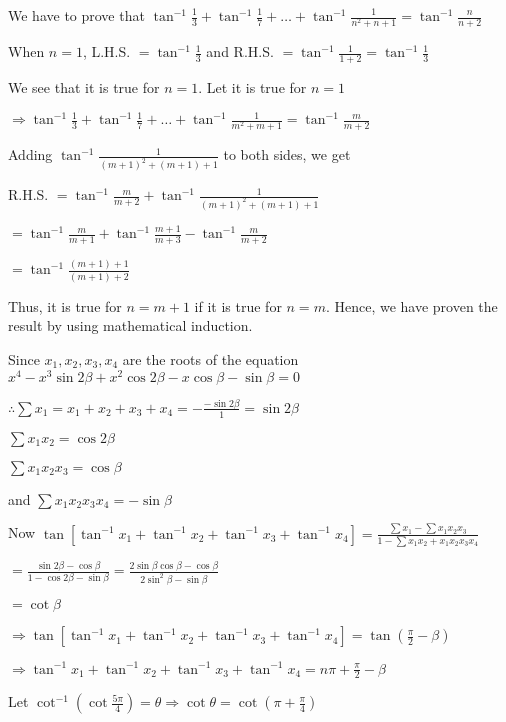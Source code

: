 \item We have to prove that $\tan^{-1}\frac{1}{3} + \tan^{-1}\frac{1}{7} + \ldots + \tan^{-1}\frac{1}{n^2 + n
  + 1} = \tan^{-1}\frac{n}{n + 2}$

  When $n = 1$, L.H.S. $=\tan^{-1}\frac{1}{3}$ and R.H.S. $= \tan^{-1}\frac{1}{1 + 2} =
  \tan^{-1}\frac{1}{3}$

  We see that it is true for $n = 1$. Let it is true for $n = 1$

  $\Rightarrow \tan^{-1}\frac{1}{3} + \tan^{-1}\frac{1}{7} + \ldots + \tan^{-1}\frac{1}{m^2 + m
    + 1} = \tan^{-1}\frac{m}{m + 2}$

  Adding $\tan^{-1}\frac{1}{(m + 1)^2 + (m + 1) + 1}$ to both sides, we get

  R.H.S. $= \tan^{-1}\frac{m}{m + 2} + \tan^{-1}\frac{1}{(m + 1)^2 + (m + 1) + 1}$

  $= \tan^{-1}\frac{m}{m + 1} + \tan^{-1}\frac{m + 1}{m + 3} - \tan^{-1}\frac{m}{m + 2}$

  $= \tan^{-1}\frac{(m + 1) + 1}{(m + 1) + 2}$

  Thus, it is true for $n = m + 1$ if it is true for $n = m$. Hence, we have proven the result by using mathematical
  induction.

\item Since $x_1, x_2, x_3, x_4$ are the roots of the equation $x^4 - x^3\sin2\beta + x^2\cos2\beta - x\cos\beta -
  \sin\beta = 0$

  $\therefore \sum x_1 = x_1 + x_2 + x_3 + x_4 = -\frac{-\sin2\beta}{1} = \sin2\beta$

  $\sum x_1x_2 = \cos2\beta$

  $\sum x_1x_2x_3 = \cos\beta$

  and $\sum x_1x_2x_3x_4 = -\sin\beta$

  Now $\tan[\tan^{-1}x_1 + \tan^{-1}x_2 + \tan^{-1}x_3 + \tan^{-1}x_4] = \frac{\sum x_1 - \sum x_1x_2x_3}{1 - \sum
    x_1x_2 + x_1x_2x_3x_4}$

  $= \frac{\sin2\beta - \cos\beta}{1 - \cos2\beta - \sin\beta} = \frac{2\sin\beta\cos\beta - \cos\beta}{2\sin^2\beta -
    \sin\beta}$

  $= \cot\beta$

  $\Rightarrow \tan[\tan^{-1}x_1 + \tan^{-1}x_2 + \tan^{-1}x_3 + \tan^{-1}x_4] = \tan\left(\frac{\pi}{2} -
  \beta\right)$

  $\Rightarrow \tan^{-1}x_1 + \tan^{-1}x_2 + \tan^{-1}x_3 + \tan^{-1}x_4 = n\pi + \frac{\pi}{2} - \beta$

\item Let $\cot^{-1}\left(\cot\frac{5\pi}{4}\right) = \theta \Rightarrow \cot\theta = \cot\left(\pi + \frac{\pi}{4}\right)$

